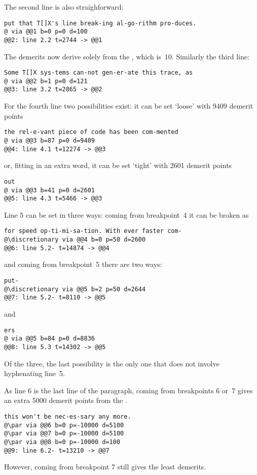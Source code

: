 The second line is also straighforward:
%
\begin{verbatim}
put that T[]X's line break-ing al-go-rithm pro-duces. 
@ via @@1 b=0 p=0 d=100
@@2: line 2.2 t=2744 -> @@1
\end{verbatim}
The demerits now derive solely from the ,
which is~10. Similarly the third line:
%
\begin{verbatim}
Some T[]X sys-tems can-not gen-er-ate this trace, as 
@ via @@2 b=1 p=0 d=121
@@3: line 3.2 t=2865 -> @@2
\end{verbatim}

For the fourth line two possibilities exist:
it can be set `loose' with 9409 demerit points
%
\begin{verbatim}
the rel-e-vant piece of code has been com-mented 
@ via @@3 b=87 p=0 d=9409
@@4: line 4.1 t=12274 -> @@3
\end{verbatim}
or, fitting in an extra word, it can be set `tight' with
2601 demerit points
%
\begin{verbatim}
out 
@ via @@3 b=41 p=0 d=2601
@@5: line 4.3 t=5466 -> @@3
\end{verbatim}

Line 5 can be set in three ways:
coming from breakpoint~4 it can be broken as
%
\begin{verbatim}
for speed op-ti-mi-sa-tion. With ever faster com-
@\discretionary via @@4 b=0 p=50 d=2600
@@6: line 5.2- t=14874 -> @@4
\end{verbatim}
and coming from breakpoint~5 there are two ways:
%
\begin{verbatim}
put-
@\discretionary via @@5 b=2 p=50 d=2644
@@7: line 5.2- t=8110 -> @@5
\end{verbatim}
and
\begin{verbatim}
ers 
@ via @@5 b=84 p=0 d=8836
@@8: line 5.3 t=14302 -> @@5
\end{verbatim}
Of the three, the last possibility is the only one that
does not involve hyphenating line~5.

As line 6 is the last line of the paragraph, coming from
breakpoints 6 or~7 gives an extra 5000 demerit points
from the .
%
\begin{verbatim}
this won't be nec-es-sary any more. 
@\par via @@6 b=0 p=-10000 d=5100
@\par via @@7 b=0 p=-10000 d=5100
@\par via @@8 b=0 p=-10000 d=100
@@9: line 6.2- t=13210 -> @@7
\end{verbatim}
However, coming from breakpoint 7 still gives the least
demerits.
